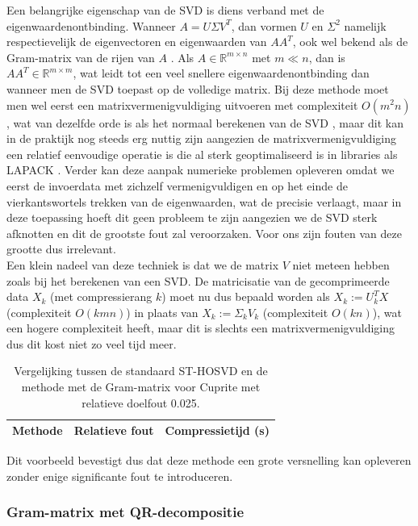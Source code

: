 Een belangrijke eigenschap van de SVD is diens verband met de eigenwaardenontbinding. Wanneer $A = U \Sigma V^T$, dan vormen $U$ en $\Sigma^2$ namelijk respectievelijk de eigenvectoren en eigenwaarden van $A A^T$, ook wel bekend als de Gram-matrix van de rijen van $A$ \cite{ref:svd}. Als $A \in \mathbb{R}^{m \times n}$ met $m \ll n$, dan is $A A^T \in \mathbb{R}^{m \times m}$, wat leidt tot een veel snellere eigenwaardenontbinding dan wanneer men de SVD toepast op de volledige matrix. Bij deze methode moet men wel eerst een matrixvermenigvuldiging uitvoeren met complexiteit $O(m^2 n)$, wat van dezelfde orde is als het normaal berekenen van de SVD \cite{ref:svd}, maar dit kan in de praktijk nog steeds erg nuttig zijn aangezien de matrixvermenigvuldiging een relatief eenvoudige operatie is die al sterk geoptimaliseerd is in libraries als LAPACK \cite{ref:lapack}. Verder kan deze aanpak numerieke problemen opleveren omdat we eerst de invoerdata met zichzelf vermenigvuldigen en op het einde de vierkantswortels trekken van de eigenwaarden, wat de precisie verlaagt, maar in deze toepassing hoeft dit geen probleem te zijn aangezien we de SVD sterk afknotten en dit de grootste fout zal veroorzaken. Voor ons zijn fouten van deze grootte dus irrelevant.\\

Een klein nadeel van deze techniek is dat we de matrix $V$ niet meteen hebben zoals bij het berekenen van een SVD. De matricisatie van de gecomprimeerde data $X_k$ (met compressierang $k$) moet nu dus bepaald worden als $X_k := U_k^T X$ (complexiteit $O(kmn)$) in plaats van $X_k := \Sigma_k V_k$ (complexiteit $O(kn)$), wat een hogere complexiteit heeft, maar dit is slechts een matrixvermenigvuldiging dus dit kost niet zo veel tijd meer.

\begin{table}[H]
\centering
\begin{tabular}{|l|l|l|}
\hline
Methode & Relatieve fout & Compressietijd (s)\\ \hline

\end{tabular}
\caption{Vergelijking tussen de standaard ST-HOSVD en de methode met de Gram-matrix voor Cuprite met relatieve doelfout 0.025.}
\end{table}
Dit voorbeeld bevestigt dus dat deze methode een grote versnelling kan opleveren zonder enige significante fout te introduceren.

\subsubsection{Gram-matrix met QR-decompositie}

